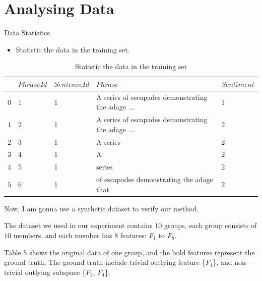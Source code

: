 \documentclass[
 size=14pt,
 paper=smartboard,  %
 mode=present, 		%
 display=slides, 	%
 style=tuliplab,  	%
 pauseslide,
 fleqn,leqno]{powerdot}
\begin{document}
\section{Analysing Data}


\begin{slide}{Data Statistics}

  \begin{itemize}
  \item Statistic the data in the training set.
  \end{itemize}
  
  \begin{table}
  \setlength{\abovecaptionskip}{0pt}
  \setlength{\belowcaptionskip}{10pt}
  \centering
  \caption{Statistic the data in the training set}
  
  \begin{tabular}{p{0.5cm}p{2.1cm}p{2.5cm}p{10.2cm}p{2.2cm}}
  \hline
      & $PhraseId$ & $SentenceId$ & $Phrase$ & $Sentiment$ \\
  \hline
    $0$   & 1 & 1  & A series of escapades demonstrating the adage ...  & 1 \\
    $1$   & 2  & 1  & A series of escapades demonstrating the adage ...  & 2 \\
    $2$   & 3  & 1 & A series  & 2 \\
    $3$   & 4  & 1  & A  & 2 \\
    $4$   & 5    & 1  & series  & 2\\
    $5$   & 6  & 1 & of escapades demonstrating the adage that & 2 \\
    
    
  \hline
  \end{tabular}
  \end{table}
  
  \begin{note}
  Now,
  I am gonna use a synthetic dataset to verify our method.
  
  The dataset we used in our experiment contains $10$ groups,
  each group consists of $10$ members,
  and each member has $8$ features: $F_1$ to $F_8$.
  
  Table $5$ shows the original data of one group,
  and the bold features represent the ground truth,
  The ground truth include trivial outlying feature \{$F_1$\},
  and non-trivial outlying subspace \{$F_2$, $F_4$\}.
  \end{note}
  
  \end{slide}
\end{document}
